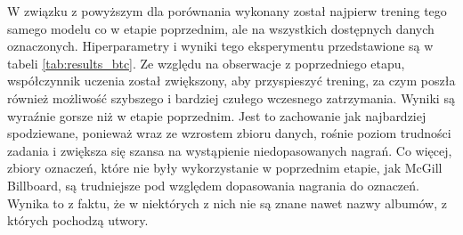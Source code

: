 W związku z powyższym dla porównania wykonany został najpierw trening tego samego modelu co w etapie poprzednim, ale na wszystkich dostępnych danych oznaczonych. Hiperparametry i wyniki tego eksperymentu przedstawione są w tabeli \ref{tab:results_btc}. Ze względu na obserwacje z poprzedniego etapu, współczynnik uczenia został zwiększony, aby przyspieszyć trening, za czym poszła również możliwość szybszego i bardziej czułego wczesnego zatrzymania. Wyniki są wyraźnie gorsze niż w etapie poprzednim. Jest to zachowanie jak najbardziej spodziewane, ponieważ wraz ze wzrostem zbioru danych, rośnie poziom trudności zadania i zwiększa się szansa na wystąpienie niedopasowanych nagrań. Co więcej, zbiory oznaczeń, które nie były wykorzystanie w poprzednim etapie, jak McGill Billboard, są trudniejsze pod względem dopasowania nagrania do oznaczeń. Wynika to z faktu, że w niektórych z nich nie są znane nawet nazwy albumów, z których pochodzą utwory.

